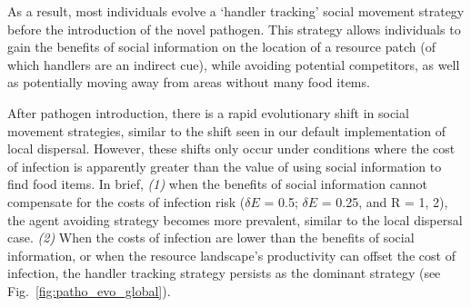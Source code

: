 As a result, most individuals evolve a `handler tracking' social movement strategy before the introduction of the novel pathogen.
This strategy allows individuals to gain the benefits of social information on the location of a resource patch (of which handlers are an indirect cue), while avoiding potential competitors, as well as potentially moving away from areas without many food items.

After pathogen introduction, there is a rapid evolutionary shift in social movement strategies, similar to the shift seen in our default implementation of local dispersal.
However, these shifts only occur under conditions where the cost of infection is apparently greater than the value of using social information to find food items.
In brief, \emph{(1)} when the benefits of social information cannot compensate for the costs of infection risk ($\delta E$ = 0.5; $\delta E$ = 0.25, and R = 1, 2), the agent avoiding strategy becomes more prevalent, similar to the local dispersal case. \emph{(2)} When the costs of infection are lower than the benefits of social information, or when the resource landscape's productivity can offset the cost of infection, the handler tracking strategy persists as the dominant strategy (see Fig.~\ref{fig:patho_evo_global}).

